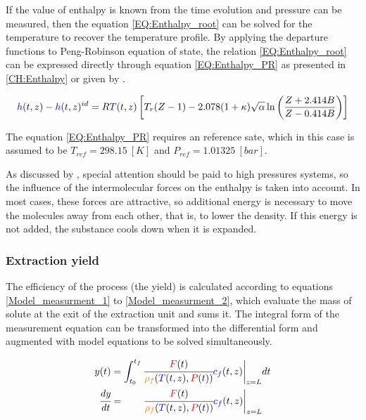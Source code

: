 \documentclass[../Article_Model_Parameters.tex]{subfiles}
\begin{document}
			If the value of enthalpy is known from the time evolution and pressure can be measured, then the equation \ref{EQ:Enthalpy_root} can be solved for the temperature to recover the temperature profile. By applying the departure functions to Peng-Robinson equation of state, the relation \ref{EQ:Enthalpy_root} can be expressed directly through equation \ref{EQ:Enthalpy_PR} as presented in \ref{CH:Enthalpy} or given by \citet{Gmehling2019}.
			
			{\footnotesize
				\begin{equation}
					{\color{blue}h}(t,z)-{\color{blue}h}(t,z)^{id}=R{\color{blue}T}(t,z) \left[T_{r}(Z-1)-2.078(1+\kappa ){\sqrt {\alpha }}\ln \left({\frac {Z+2.414B}{Z-0.414B}}\right)\right]
					\label{EQ:Enthalpy_PR}
				\end{equation}
			}
		
			The equation \ref{EQ:Enthalpy_PR} requires an reference sate, which in this case is assumed to be $T_{ref}=298.15~[K]$ and $P_{ref}=1.01325~[bar]$.
			
			As discussed by \citet{Gmehling2019}, special attention should be paid to high pressures systems, so the influence of the intermolecular forces on the enthalpy is taken into account. In most cases, these forces are attractive, so additional energy is necessary to move the molecules away from each other, that is, to lower the density. If this energy is not added, the substance cools down when it is expanded.
  
		\subsubsection{Extraction yield} \label{CH: Yield} 
			
		The efficiency of the process (the yield) is calculated according to equations \ref{Model_measurment_1} to \ref{Model_measurment_2}, which evaluate the mass of solute at the exit of the extraction unit and sums it. The integral form of the measurement equation can be transformed into the differential form and augmented with model equations to be solved simultaneously.
			
		{\footnotesize
			\begin{align} 
				\label{Model_measurment_1}
				y(t) &= \int_{t_0}^{t_f} \cfrac{{\color{red}F}(t)}{{\color{orange}\rho_f}({\color{blue}T}(t,z),{\color{red}P}(t))} {\color{blue}c_f}(t,z) \biggr\rvert_{z=L} dt \\
				\cfrac{dy}{dt} &= \qquad \cfrac{{\color{red}F}(t)}{{\color{orange}\rho_f}({\color{blue}T}(t,z),{\color{red}P}(t))} {\color{blue}c_f}(t,z) \biggr\rvert_{z=L} 
                \label{Model_measurment_2}
		\end{align}	}
  
\end{document}
